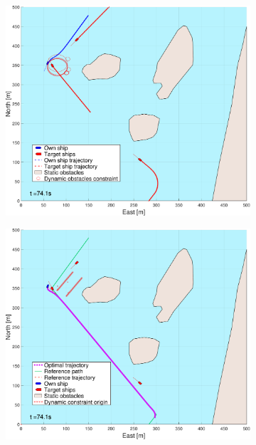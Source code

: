 \begin{figure}[!ht]
\begin{subfigure}[b]{0.494\textwidth}
        \subcaption{}
    \end{subfigure}
    \hfill
    \\
    \begin{subfigure}[b]{0.494\textwidth}
        \centering
        \includegraphics[width=\textwidth]{Images/NewFigures/Helloya_Rev/_Simple_0fig1_time=75}
        \subcaption{}
    \end{subfigure}
    \hfill
    \begin{subfigure}[b]{0.494\textwidth}
        \centering
        \includegraphics[width=\textwidth]{Images/NewFigures/Helloya_Rev/_Simple_0fig999_time=75}

\end{subfigure}
\end{figure}

